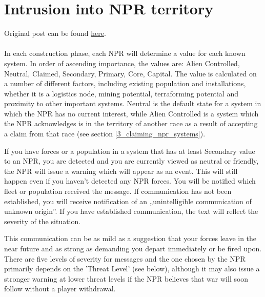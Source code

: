 \documentclass[../../Aurora C# unofficial manual.tex]{subfiles}
\begin{document}
	\section{Intrusion into NPR territory}\label{2_intrusion_into_npr}
	Original post can be found
	\href{http://aurora2.pentarch.org/index.php?topic=8495.msg118318#msg118318}{here}.
	\\\\
	
	In each construction phase, each NPR will determine a value for each known system. In order of ascending importance, the values are: Alien Controlled, Neutral, Claimed, Secondary, Primary, Core, Capital. The value is calculated on a number of different factors, including existing population and installations, whether it is a logistics node, mining potential, terraforming potential and proximity to other important systems. Neutral is the default state for a system in which the NPR has no current interest, while Alien Controlled is a system which the NPR acknowledges is in the territory of another race as a result of accepting a claim from that race (see section \ref{3_claiming_npr_systems}).
	
	If you have forces or a population in a system that has at least Secondary value to an NPR, you are detected and you are currently viewed as neutral or friendly, the NPR will issue a warning which will appear as an event. This will still happen even if you haven't detected any NPR forces. You will be notified which fleet or population received the message. If communication has not been established, you will receive notification of an „unintelligible communication of unknown origin”. If you have established communication, the text will reflect the severity of the situation.
	
	This communication can be as mild as a suggestion that your forces leave in the near future and as strong as demanding you depart immediately or be fired upon. There are five levels of severity for messages and the one chosen by the NPR primarily depends on the 'Threat Level' (see below), although it may also issue a stronger warning at lower threat levels if the NPR believes that war will soon follow without a player withdrawal.
	
\end{document}
